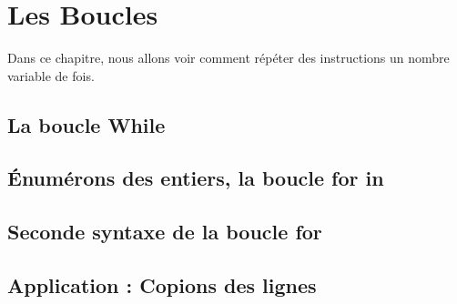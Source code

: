 \chapter{Les Boucles}
Dans ce chapitre, nous allons voir comment
répéter des instructions un nombre variable de fois.
\section{La boucle While}
\section{Énumérons des entiers, la boucle for in}
\section{Seconde syntaxe de la boucle for}
\section{Application : Copions des lignes}